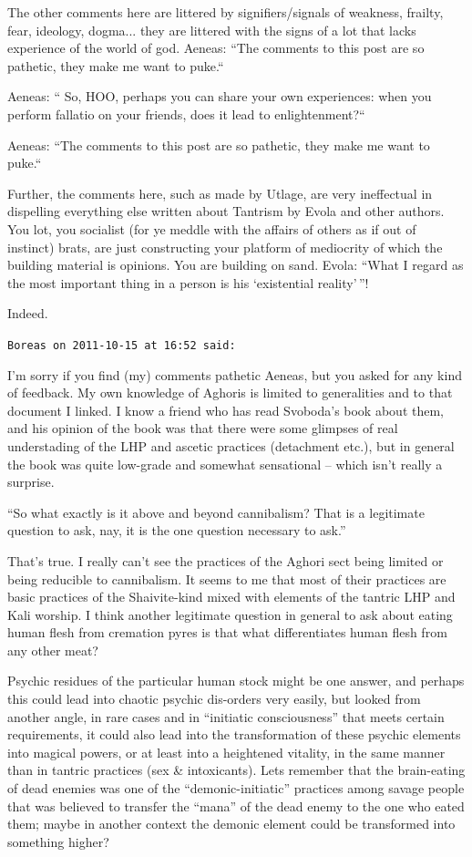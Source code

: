 \begin{footnotesize}
\begin{sffamily}
The other comments here are littered by signifiers/signals of weakness, frailty, fear, ideology, dogma... they are littered with the signs of a lot that lacks experience of the world of god. Aeneas: ``The comments to this post are so pathetic, they make me want to puke.``

Aeneas: `` So, HOO, perhaps you can share your own experiences: when you perform fallatio on your friends, does it lead to enlightenment?{\kern0pt}``

Aeneas: ``The comments to this post are so pathetic, they make me want to puke.``

Further, the comments here, such as made by Utlage, are very ineffectual in dispelling everything else written about Tantrism by Evola and other authors. You lot, you socialist (for ye meddle with the affairs of others as if out of instinct) brats, are just constructing your platform of mediocrity of which the building material is opinions. You are building on sand. Evola: ``What I regard as the most important thing in a person is his `existential reality'\,''!

Indeed.

\hfill

\texttt{Boreas on 2011-10-15 at 16:52 said:}

I'm sorry if you find (my) comments pathetic Aeneas, but you asked for any kind of feedback. My own knowledge of Aghoris is limited to generalities and to that document I linked. I know a friend who has read Svoboda's book about them, and his opinion of the book was that there were some glimpses of real understading of the LHP and ascetic practices (detachment etc.), but in general the book was quite low-grade and somewhat sensational -- which isn't really a surprise.

``So what exactly is it above and beyond cannibalism? That is a legitimate question to ask, nay, it is the one question necessary to ask.''

That's true. I really can't see the practices of the Aghori sect being limited or being reducible to cannibalism. It seems to me that most of their practices are basic practices of the Shaivite-kind mixed with elements of the tantric LHP and Kali worship. I think another legitimate question in general to ask about eating human flesh from cremation pyres is that what differentiates human flesh from any other meat?

Psychic residues of the particular human stock might be one answer, and perhaps this could lead into chaotic psychic dis-orders very easily, but looked from another angle, in rare cases and in ``initiatic consciousness'' that meets certain requirements, it could also lead into the transformation of these psychic elements into magical powers, or at least into a heightened vitality, in the same manner than in tantric practices (sex \& intoxicants). Lets remember that the brain-eating of dead enemies was one of the ``demonic-initiatic'' practices among savage people that was believed to transfer the ``mana'' of the dead enemy to the one who eated them; maybe in another context the demonic element could be transformed into something higher?


\end{sffamily}
\end{footnotesize}
